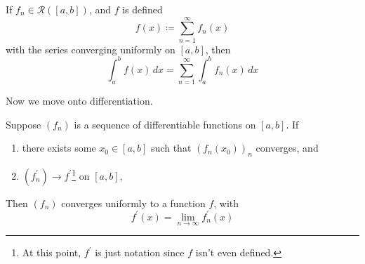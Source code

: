   \begin{corollary}
    \label{thm:series-function-may-be-integrated-term-by-term}
    If $f_n \in \mathcal{R}([a, b])$, and $f$ is defined 
    \begin{equation}
      f(x) \coloneqq \sum_{n=1}^\infty f_n (x) 
    \end{equation}
    with the series converging uniformly on $[a, b]$, then 
    \begin{equation}
      \int_a^b f(x) \,dx = \sum_{n=1}^\infty \int_a^b f_n (x)\,dx
    \end{equation}
  \end{corollary}

  Now we move onto differentiation. 

  \begin{theorem}
    \label{thm:limits-of-derivatives}
    Suppose $(f_n)$ is a sequence of differentiable functions on $[a, b]$. If 
    \begin{enumerate}
      \item there exists some $x_0 \in [a, b]$ such that $(f_n (x_0))_n$ converges, and 
      \item $(f_n^\prime) \to f^\prime$\footnote{At this point, $f^\prime$ is just notation since $f$ isn't even defined.} on $[a, b]$, 
    \end{enumerate}
    Then $(f_n)$ converges uniformly to a function $f$, with 
    \begin{equation}
      f^\prime (x) = \lim_{n \to \infty} f_n^\prime (x) 
    \end{equation}
  \end{theorem} 
